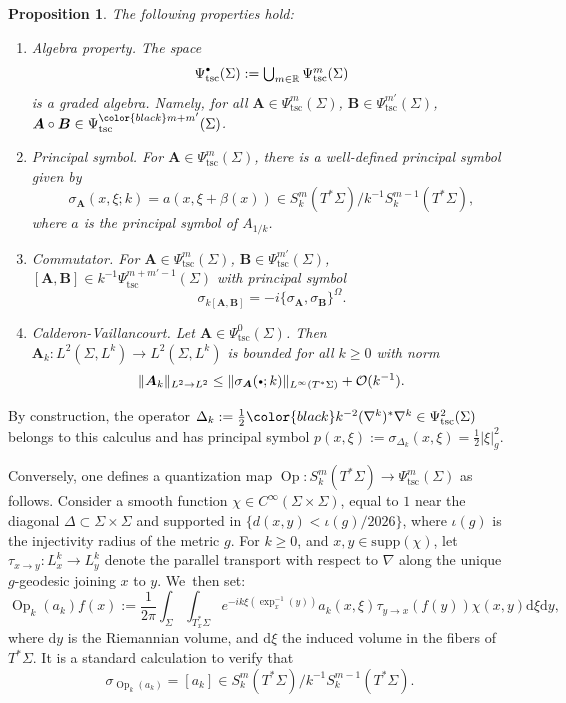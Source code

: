 \documentclass[JEP,XML,SOM,Unicode,published]{cedram}
\newcommand{\sbullet}{{\scriptscriptstyle\bullet}}
\newcommand{\csbullet}{{\raisebox{1pt}{$\sbullet$}}}
\newcommand{\bA}{\boldsymbol{A}}
\newcommand{\bB}{\boldsymbol{B}}
\theoremstyle{plain}
\newtheorem{proposition}[theorem]{Proposition}
\theoremstyle{definition}
\let\mc\mathcal
\newcommand{\R}{\mathbb{R}}
\newcommand{\dd}{\mathrm{d}}
\DeclareMathOperator{\Op}{Op}
\begin{document}
\begin{proposition}
The following properties hold:

\begin{enumerate}

\item \emph{Algebra property.} The space
\[\textstyle
\Psi^\csbullet_{\mathrm{tsc}}(\Sigma) := \bigcup_{m \in \R} \Psi^m_{\mathrm{tsc}}(\Sigma)
\]
is a graded algebra. Namely, for all $\bA\in\Psi^m_{\mathrm{tsc}}(\Sigma)$, $\bB\in\Psi^{m'}_{\mathrm{tsc}}(\Sigma)$, $\bA \circ \bB \in \Psi^{\color{black}m+m'}_{\mathrm{tsc}}(\Sigma)$.

\item \emph{Principal symbol.} For $\bA \in \Psi^m_{\mathrm{tsc}}(\Sigma)$, there is a well-defined principal symbol given by
\[
\sigma_{\bA}(x,\xi ; k) = a(x,\xi + \beta(x)) \in
S^m_{k}(T^*\Sigma)/k^{-1}S^{m-1}_{k}(T^*\Sigma),
\]
where $a$ is the principal symbol of $A_{1/k}$.

\item \emph{Commutator.} For $\bA \in \Psi^m_{\mathrm{tsc}}(\Sigma)$, $\bB \in \Psi^{m'}_{\mathrm{tsc}}(\Sigma)$, $[\bA,\bB] \in k^{-1}\Psi^{m+m'-1}_{\mathrm{tsc}}(\Sigma)$ with principal symbol
\[
\sigma_{k[\bA,\bB]} = -i \{\sigma_{\bA},\sigma_{\bB}\}^\Omega.
\]

\item \emph{Calderon-Vaillancourt.} Let $\bA \in \Psi^0_{\mathrm{tsc}}(\Sigma)$. Then $\bA_k : L^2(\Sigma,L^k) \to L^2(\Sigma,L^k)$ is bounded for all $k \geq 0$ with norm
\[
\|\bA_k\|_{L^2 \to L^2} \leq \|\sigma_{\bA}(\csbullet;k)\|_{L^\infty(T^*\Sigma)} + \mc{O}(k^{-1}).
\]

\end{enumerate}

\end{proposition}

By construction, the operator $\Delta_k := \tfrac{1}{2} {\color{black}k^{-2}} (\nabla^k)^*\nabla^k \in \Psi^2_{\mathrm{tsc}}(\Sigma)$ belongs to this calculus and has principal symbol $p(x,\xi) := \sigma_{\Delta_k}(x,\xi) = \tfrac{1}{2}|\xi|^2_g$.

Conversely, one defines a quantization map $\Op : S^m_{k}(T^*\Sigma) \to \Psi^m_{\mathrm{tsc}}(\Sigma)$ as follows. Consider a smooth function $\chi \in C^\infty(\Sigma \times \Sigma)$, equal to $1$ near the diagonal $\Delta \subset \Sigma \times \Sigma$ and supported in $\{d(x,y) < \iota(g)/2026\}$, where $\iota(g)$ is the injectivity radius of the metric $g$. For $k \geq 0$, and $x,y \in \mathrm{supp}(\chi)$, let $\tau_{x \to y} : L^k_x \to L^k_y$ denote the parallel transport with respect to $\nabla$ along the unique $g$-geodesic joining $x$ to $y$. We~then set:
\[
\Op_{k}(a_{k}) f(x) := \dfrac{1}{2\pi} \int_{\Sigma} \int_{T^*_x\Sigma} e^{-ik\xi(\exp^{-1}_x(y))} a_{k}(x,\xi) \tau_{y \to x}(f(y)) \chi(x,y) \dd\xi \dd y,
\]
where $\dd y$ is the Riemannian volume, and $\dd\xi$ the induced volume in the fibers of $T^*\Sigma$. It is a standard calculation to verify that
\[
\sigma_{\Op_{k}(a_{k})} = [a_{k}] \in S^m_{k}(T^*\Sigma)/k^{-1}S^{m-1}_{k}(T^*\Sigma).
\]
\end{document}
